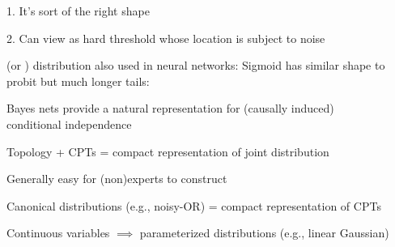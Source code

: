\documentclass{article}
\begin{document}
\begin{huge}
1. It's sort of the right shape

2. Can view as hard threshold whose location is subject to noise

\textwidth
{}





 (or ) distribution also used in neural networks:
\mat{\[
P(Buys?\eq true \given Cost \eq c) = \frac{1}{1+exp(-2\frac{-c+\mu}{\sigma})}
\]}
Sigmoid has similar shape to probit but much longer tails:

\textwidth
{}


Bayes nets provide a natural representation for (causally induced)\\
conditional independence

Topology + CPTs = compact representation of joint distribution

Generally easy for (non)experts to construct

Canonical distributions (e.g., noisy-OR) = compact representation of CPTs

Continuous variables $\implies$ parameterized distributions (e.g., linear
Gaussian)



\end{huge} 
\end{document}
